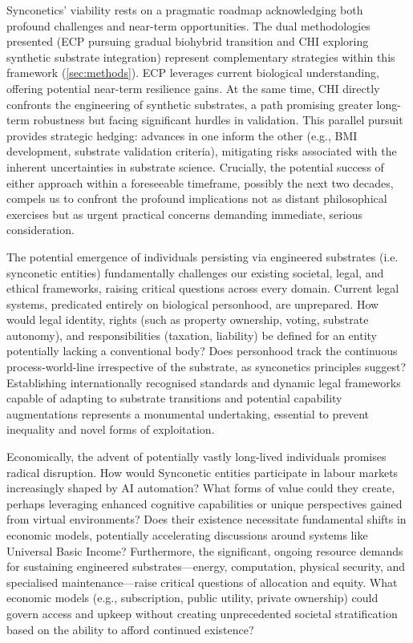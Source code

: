 \documentclass[10pt]{article}
\begin{document}
\begin{sloppypar}
  Synconetics’ viability rests on a pragmatic roadmap acknowledging both profound challenges and near-term opportunities. The dual methodologies presented (ECP pursuing gradual biohybrid transition and CHI exploring synthetic substrate integration) represent complementary strategies within this framework (\autoref{sec:methods}). ECP leverages current biological understanding, offering potential near-term resilience gains. At the same time, CHI directly confronts the engineering of synthetic substrates, a path promising greater long-term robustness but facing significant hurdles in validation. This parallel pursuit provides strategic hedging: advances in one inform the other (e.g., BMI development, substrate validation criteria), mitigating risks associated with the inherent uncertainties in substrate science. Crucially, the potential success of either approach within a foreseeable timeframe, possibly the next two decades, compels us to confront the profound implications not as distant philosophical exercises but as urgent practical concerns demanding immediate, serious consideration.

  The potential emergence of individuals persisting via engineered substrates (i.e. synconetic entities) fundamentally challenges our existing societal, legal, and ethical frameworks, raising critical questions across every domain. Current legal systems, predicated entirely on biological personhood, are unprepared. How would legal identity, rights (such as property ownership, voting, substrate autonomy), and responsibilities (taxation, liability) be defined for an entity potentially lacking a conventional body? Does personhood track the continuous process-world-line irrespective of the substrate, as synconetics principles suggest? Establishing internationally recognised standards and dynamic legal frameworks capable of adapting to substrate transitions and potential capability augmentations represents a monumental undertaking, essential to prevent inequality and novel forms of exploitation.

  Economically, the advent of potentially vastly long-lived individuals promises radical disruption. How would Synconetic entities participate in labour markets increasingly shaped by AI automation? What forms of value could they create, perhaps leveraging enhanced cognitive capabilities or unique perspectives gained from virtual environments? Does their existence necessitate fundamental shifts in economic models, potentially accelerating discussions around systems like Universal Basic Income? Furthermore, the significant, ongoing resource demands for sustaining engineered substrates—energy, computation, physical security, and specialised maintenance—raise critical questions of allocation and equity. What economic models (e.g., subscription, public utility, private ownership) could govern access and upkeep without creating unprecedented societal stratification based on the ability to afford continued existence?


\end{sloppypar}
\end{document}
